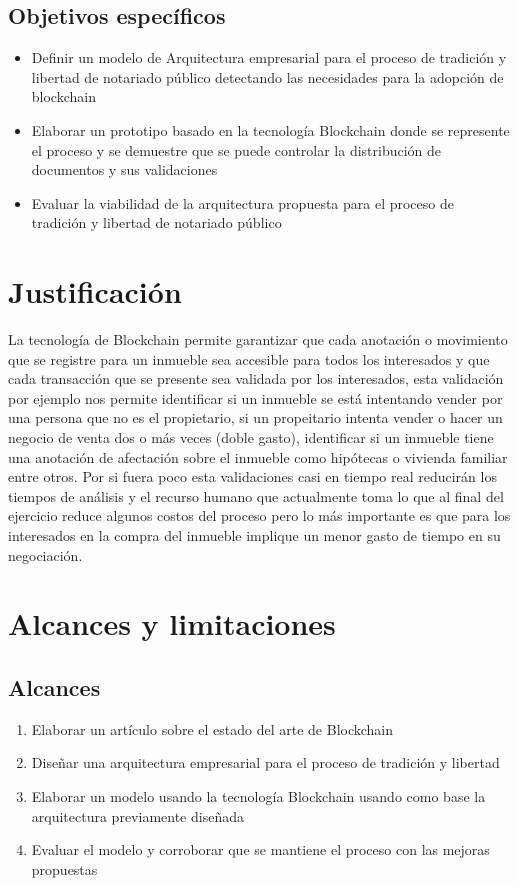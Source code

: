 \subsection{Objetivos específicos}
\begin{itemize}

\item Definir un modelo de Arquitectura empresarial para el proceso de tradición y libertad de notariado público detectando las necesidades para la adopción de blockchain

\item Elaborar un prototipo basado en la tecnología Blockchain donde se represente el proceso y se demuestre que se puede controlar la distribución de documentos y sus validaciones

\item Evaluar la viabilidad de la arquitectura propuesta para el proceso de tradición y libertad de notariado público
\end{itemize}

\section{Justificación}

 La tecnología de Blockchain permite garantizar que cada anotación o movimiento que se registre para un inmueble sea accesible para todos los interesados y que cada transacción que se presente sea validada por los interesados, esta validación por ejemplo nos permite identificar si un inmueble se está intentando vender por una persona que no es el propietario, si un propeitario intenta vender o hacer un negocio de venta dos o más veces (doble gasto), identificar si un inmueble tiene una anotación de afectación sobre el inmueble como hipótecas o vivienda familiar entre otros. Por si fuera poco esta validaciones casi en tiempo real reducirán los tiempos de análisis y el recurso humano que actualmente toma lo que al final del ejercicio reduce algunos costos del proceso pero lo más importante es que para los interesados en la compra del inmueble implique un menor gasto de tiempo en su negociación.

\section{Alcances y limitaciones}

\subsection{Alcances}
\begin{enumerate}
\item Elaborar un artículo sobre el estado del arte de Blockchain
\item Diseñar una arquitectura empresarial para el proceso de tradición y libertad
\item Elaborar un modelo usando la tecnología Blockchain usando como base la arquitectura previamente diseñada
\item Evaluar el modelo y corroborar que se mantiene el proceso con las mejoras propuestas
\end{enumerate}


